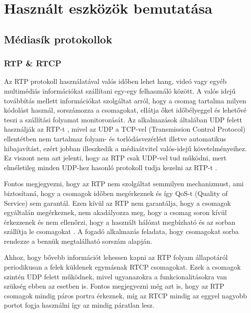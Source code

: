 \chapter{Használt eszközök bemutatása}

\section{Médiasík protokollok}

\subsection{RTP \& RTCP}

Az RTP protokoll használatával valós időben lehet hang, videó vagy egyéb multimédiás 
információkat szállítani egy-egy felhasználó között. A valós idejű továbbítás mellett
információkat szolgáltat arról, hogy a csomag tartalma milyen kódolást használ, 
sorszámozza a csomagokat, ellátja őket időbélyeggel és lehetővé teszi a szállítási 
folyamat monitorozását. Az alkalmazások általában UDP felett használják az RTP-t 
\cite{RFC3550}, mivel az UDP a TCP-vel (Transmission Control Protocol) ellentétben nem 
tartalmaz folyam- és torlódásvezérlést illetve automatikus hibajavítást, ezért jobban 
illeszkedik a médiaátvitel valós-idejű követelményeihez. Ez viszont nem azt jelenti, hogy 
az RTP csak UDP-vel tud működni, mert elméletileg minden UDP-hez hasonló protokoll tudja 
kezelni az RTP-t \cite{RFC3550}.

Fontos megjegyezni, hogy az RTP nem szolgáltat semmilyen mechanizmust, ami biztosítaná,
hogy a csomagok időben megérkeznek és így QoS-t (Quality of Service) sem garantál. Ezen 
kívül az RTP nem garantálja, hogy a csomagok egyáltalán megérkeznek, nem akadályozza meg, 
hogy a csomag soron kívül érkezzenek és nem ellenőrzi, hogy a használt hálózat megbízható 
és az sorban szállítja le csomagokat \cite{RFC3550}. A fogadó alkalmazás feladata, hogy 
csomagokat sorba rendezze a bennük megtalálható sorszám alapján.

Ahhoz, hogy bővebb információt lehessen kapni az RTP folyam állapotáról periodikusan a 
felek küldenek egymásnak RTCP csomagokat. Ezek a csomagok szintén UDP felett működnek,
mivel ugyanazokra a funkcionalitásokra van szükség ebben az esetben is. Fontos megjegyezni
még azt is, hogy az RTP csomagok mindig páros portra érkeznek, míg az RTCP mindig az eggyel nagyobb portot fogja használni így az mindig páratlan lesz.

